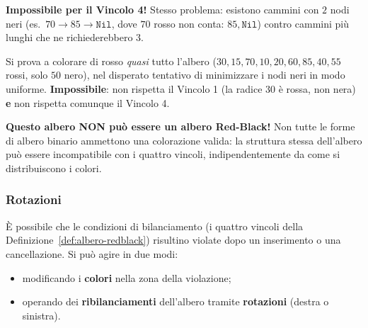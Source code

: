 \documentclass[12pt, a4paper]{article}
\begin{document}
\begin{tcolorbox}[colback=lightergray!5, colframe=tocsubsec, title=\textbf{Tentativo 3: $70$ Rosso}]
\textbf{Impossibile per il Vincolo 4!} Stesso problema: esistono cammini con $2$ nodi neri (es.\ $70\to85\to\texttt{Nil}$, dove $70$ rosso non conta: $85,\texttt{Nil}$) contro cammini più lunghi che ne richiederebbero $3$.
\end{tcolorbox}

\begin{tcolorbox}[colback=lightergray!5, colframe=tocsubsec, title=\textbf{Tentativo 4 (Ultima Possibilità): Radice Rossa}]
Si prova a colorare di rosso \emph{quasi} tutto l'albero ($30,15,70,10,20,60,85,40,55$ rossi, solo $50$ nero), nel disperato tentativo di minimizzare i nodi neri in modo uniforme. \textbf{Impossibile}: non rispetta il Vincolo 1 (la radice $30$ è rossa, non nera) \textbf{e} non rispetta comunque il Vincolo 4.
\end{tcolorbox}

\begin{tcolorbox}[colback=lightergray!10, colframe=tocsec, title=\textbf{Conclusione}]
\textbf{Questo albero NON può essere un albero Red-Black!} Non tutte le forme di albero binario ammettono una colorazione valida: la struttura stessa dell'albero può essere incompatibile con i quattro vincoli, indipendentemente da come si distribuiscono i colori.
\end{tcolorbox}








\subsubsection{Rotazioni}

\begin{tcolorbox}[colback=lightergray!5, colframe=tocsubsec, title=\textbf{Quando un'Operazione Viola i Vincoli}]
È possibile che le condizioni di bilanciamento (i quattro vincoli della Definizione~\ref{def:albero-redblack}) risultino violate dopo un inserimento o una cancellazione. Si può agire in due modi:
\begin{itemize}
    \item modificando i \textbf{colori} nella zona della violazione;
    \item operando dei \textbf{ribilanciamenti} dell'albero tramite \textbf{rotazioni} (destra o sinistra).
\end{itemize}
\end{tcolorbox}
\end{document}
